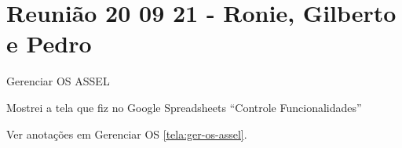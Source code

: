 \section{Reunião 20 09 21 - Ronie, Gilberto e Pedro}
\label{reuniao:r200921}

Gerenciar OS ASSEL

Mostrei a tela que fiz no Google Spreadsheets ``Controle Funcionalidades''

Ver anotações em Gerenciar OS \ref{tela:ger-os-assel}.



